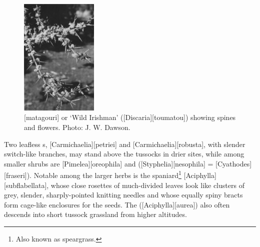 \begin{figure}
	\includegraphics[width=0.33\textwidth]{graphics/fig_083}
	\centering
	\caption[Matagouri]{[matagouri] or `Wild Irishman' ([Discaria][toumatou]) showing spines and flowers.
	Photo:  J. W. Dawson.}%
	\label{fig:83matagouri}
\end{figure}

Two leafless s, [Carmichaelia][petriei] and [Carmichaelia][robusta], with slender switch-like branches, may stand above the tussocks in drier sites, while among smaller shrubs are [Pimelea][oreophila] and  ([Styphelia][nesophila] = [Cyathodes][fraseri]).
Notable among the larger herbs is the spaniard\footnote{Also known as speargrass.} [Aciphylla][subflabellata], whose close rosettes of much-divided leaves look like clusters of grey, slender, sharply-pointed knitting needles and whose equally spiny bracts form cage-like enclosures for the seeds.
The  ([Aciphylla][aurea]) also often descends into short tussock grassland from higher altitudes.

